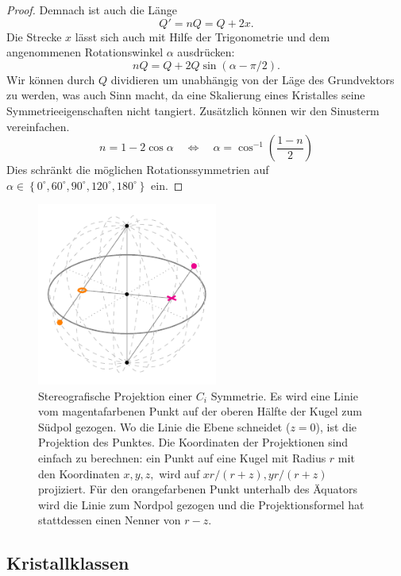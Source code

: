 \begin{proof}
 Demnach ist auch die Länge
 \[
    Q' = nQ = Q + 2x .
 \]
 Die Strecke \(x\) lässt sich auch mit Hilfe der Trigonometrie und dem angenommenen Rotationswinkel \(\alpha\) ausdrücken:
 \[
    nQ = Q + 2Q\sin(\alpha - \pi/2) .
 \]
 Wir können durch \(Q\) dividieren um unabhängig von der Läge des Grundvektors zu werden, was auch Sinn macht, 
 da eine Skalierung eines Kristalles seine Symmetrieeigenschaften nicht tangiert.
 Zusätzlich können wir den Sinusterm vereinfachen.
 \[
     n = 1 - 2\cos\alpha \quad\iff\quad
     \alpha = \cos^{-1}\left(\frac{1-n}{2}\right)
 \]
 Dies schränkt die möglichen Rotationssymmetrien auf 
 \(
     \alpha \in \left\{ 0^\circ, 60^\circ, 90^\circ, 120^\circ, 180^\circ\right\}
 \)
ein.
\end{proof}

\begin{figure}
    \centering
    \includegraphics[height=6cm]{papers/punktgruppen/figures/stereographic-projections}
    \caption{
      Stereografische Projektion einer \(C_{i}\) Symmetrie. Es wird eine Linie vom magentafarbenen Punkt auf der oberen Hälfte der Kugel zum Südpol gezogen.
      Wo die Linie die Ebene schneidet (\(z = 0\)), ist die Projektion des Punktes.
      Die Koordinaten der Projektionen sind einfach zu berechnen: ein Punkt auf eine Kugel mit Radius \(r\) mit den Koordinaten \(x, y, z,\) wird auf \(xr/(r + z), yr/(r + z)\) projiziert.
      Für den orangefarbenen Punkt unterhalb des Äquators wird die Linie zum Nordpol gezogen und die Projektionsformel hat stattdessen einen Nenner von \(r - z\).
    }
    \label{fig:punktgruppen:stereographic-projections}
\end{figure}

\subsection{Kristallklassen}

